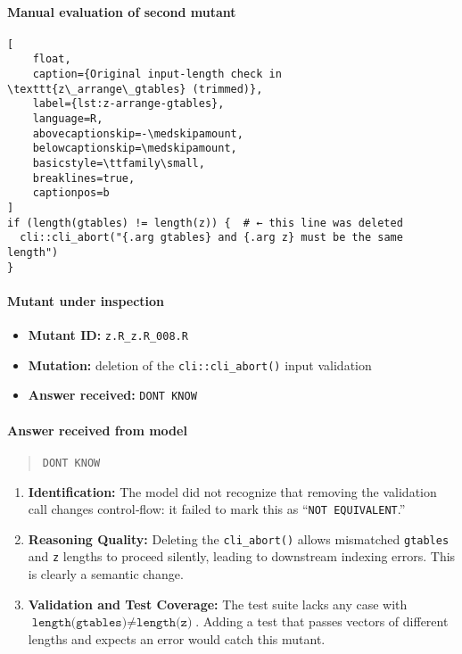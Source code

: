 \paragraph{Manual evaluation of second mutant}
\begin{lstlisting}[
    float,
    caption={Original input‐length check in \texttt{z\_arrange\_gtables} (trimmed)},
    label={lst:z-arrange-gtables},
    language=R,
    abovecaptionskip=-\medskipamount,
    belowcaptionskip=\medskipamount,
    basicstyle=\ttfamily\small,
    breaklines=true,
    captionpos=b
]
if (length(gtables) != length(z)) {  # ← this line was deleted
  cli::cli_abort("{.arg gtables} and {.arg z} must be the same length")
}
\end{lstlisting}

\paragraph{Mutant under inspection}
\begin{itemize}
  \item \textbf{Mutant ID:} \texttt{z.R\_z.R\_008.R}
  \item \textbf{Mutation:} deletion of the \texttt{cli::cli\_abort()} input validation
  \item \textbf{Answer received:} \texttt{DONT KNOW}
\end{itemize}

\paragraph{Answer received from model}
\begin{quote}
\texttt{DONT KNOW}
\end{quote}

\begin{enumerate}
  \item \textbf{Identification:}  
    The model did not recognize that removing the validation call changes control‐flow: it failed to mark this as “\texttt{NOT EQUIVALENT}.”

  \item \textbf{Reasoning Quality:}  
    Deleting the \texttt{cli\_abort()} allows mismatched \texttt{gtables} and \texttt{z} lengths to proceed silently, leading to downstream indexing errors. This is clearly a semantic change.

  \item \textbf{Validation and Test Coverage:}  
    The test suite lacks any case with \(\texttt{length(gtables)} \neq \texttt{length(z)}\). Adding a test that passes vectors of different lengths and expects an error would catch this mutant.
\end{enumerate}

